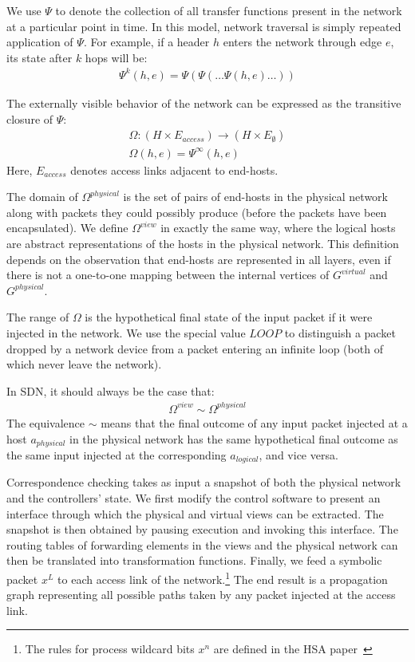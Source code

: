 We use $\Psi$ to denote the collection of all transfer functions present in
the network at a particular point in time. In this model, network traversal is
simply repeated application of $\Psi$.
For example, if a header $h$ enters the network through edge
$e$, its state after $k$ hops will be:
\begin{align*}
\Psi^k(h,e) = \Psi(\Psi(\dots \Psi(h,e)\dots))
\end{align*}

The externally visible behavior of the network can be expressed as the
transitive closure of $\Psi$:
\begin{align*}
\Omega: (H \times E_{access}) \rightarrow (H \times E_{\emptyset}) \\
\Omega(h,e) = \Psi^{\infty}(h,e)
\end{align*}
Here, $E_{access}$ denotes access links adjacent to end-hosts.

The domain of $\Omega^{physical}$ is the set of pairs of end-hosts in the
physical network along with packets they could possibly produce (before
the packets have been encapsulated). We define $\Omega^{view}$ in exactly the same way, where
the logical hosts are abstract representations of the hosts in the physical
network. This definition depends on the observation that end-hosts are represented
in all layers, even if there is not a one-to-one mapping between the
internal vertices of $G^{virtual}$ and $G^{physical}$.

The range of $\Omega$ is the hypothetical final state of the
input packet if it were injected in the network.
We use the special value $LOOP$ to distinguish
a packet dropped by a network device from a packet entering an
infinite loop (both of which never leave the network).

In SDN, it should always be the case that:
\begin{align*}
\Omega^{view} \sim \Omega^{physical}
\end{align*}
The equivalence $\sim$ means that the final outcome of any input packet
injected at a host $a_{physical}$ in the physical network has the same hypothetical final outcome as
the same input injected at the corresponding $a_{logical}$, and vice versa.

Correspondence checking takes as input a
snapshot of both the physical network and the
controllers' state. We first modify the control software to present an
interface through which the physical and virtual views can be
extracted. The snapshot is
then obtained by pausing execution and invoking this interface.
The routing tables of forwarding elements in the views and the physical
network can then be translated into transformation functions.
Finally, we feed a symbolic packet $x^L$ to each access link of the
network.\footnote{The rules for process wildcard bits $x^n$ are defined in
the HSA paper~\cite{hsa}} The end result is a propagation graph representing
all possible paths taken by any packet injected
at the access link.


